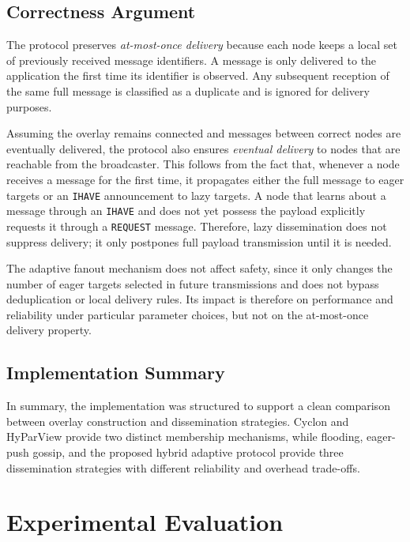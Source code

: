 \documentclass[sigconf,a4paper]{acmart}
\begin{document}
\subsection{Correctness Argument}

The protocol preserves \emph{at-most-once delivery} because each node keeps
a local set of previously received message identifiers. A message is only
delivered to the application the first time its identifier is observed.
Any subsequent reception of the same full message is classified as a
duplicate and is ignored for delivery purposes.

Assuming the overlay remains connected and messages between correct nodes
are eventually delivered, the protocol also ensures \emph{eventual delivery}
to nodes that are reachable from the broadcaster. This follows from the
fact that, whenever a node receives a message for the first time, it
propagates either the full message to eager targets or an \texttt{IHAVE}
announcement to lazy targets. A node that learns about a message through
an \texttt{IHAVE} and does not yet possess the payload explicitly requests
it through a \texttt{REQUEST} message. Therefore, lazy dissemination does
not suppress delivery; it only postpones full payload transmission until
it is needed.

The adaptive fanout mechanism does not affect safety, since it only changes
the number of eager targets selected in future transmissions and does not
bypass deduplication or local delivery rules. Its impact is therefore on
performance and reliability under particular parameter choices, but not on
the at-most-once delivery property.

\subsection{Implementation Summary}

In summary, the implementation was structured to support a clean
comparison between overlay construction and dissemination strategies.
Cyclon and HyParView provide two distinct membership mechanisms, while
flooding, eager-push gossip, and the proposed hybrid adaptive protocol
provide three dissemination strategies with different reliability and
overhead trade-offs.

\section{Experimental Evaluation}
\label{sec:evaluation}
\end{document}
